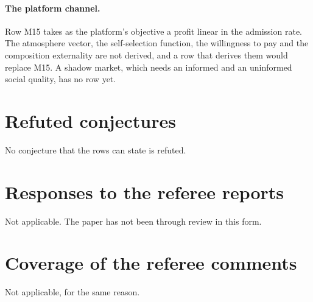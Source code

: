 \paragraph{The platform channel.} Row M15 takes as the platform's objective a profit
linear in the admission rate. The atmosphere vector, the
self-selection function, the willingness to pay and the composition
externality are not derived, and a row that derives them would replace M15.
A shadow market, which needs an informed and an uninformed social quality,
has no row yet.

\section{Refuted conjectures}
\label{app:refuted}

No conjecture that the rows can state is refuted.

\section{Responses to the referee reports}

Not applicable. The paper has not been through review in this form.

\section{Coverage of the referee comments}

Not applicable, for the same reason.


